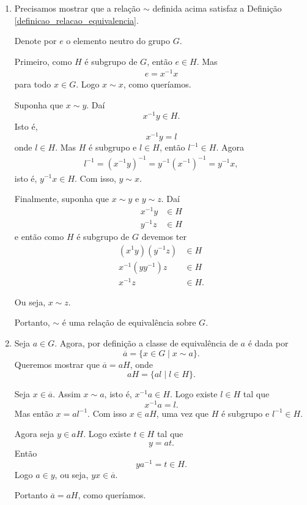 \begin{prova}
    \begin{enumerate}[label={\roman*})]
        \item Precisamos mostrar que a relação $\sim$ definida acima satisfaz a Definição \eqref{definicao_relacao_equivalencia}.

        Denote por $e$ o elemento neutro do grupo $G$.

        Primeiro, como $H$ é subgrupo de $G$, então $e \in H$. Mas
        \begin{align*}
            e = x^{-1}x
        \end{align*}
        para todo $x \in G$. Logo $x \sim x$, como queríamos.

        Suponha que $x \sim y$. Daí
        \[
            x^{-1}y \in H.
        \]
        Isto é,
        \[
            x^{-1}y = l
        \]
        onde $l \in H$. Mas $H$ é subgrupo e $l \in H$, então $l^{-1} \in H$. Agora
        \begin{align*}
            l^{-1} = (x^{-1}y)^{-1} = y^{-1}(x^{-1})^{-1} = y^{-1}x,
        \end{align*}
        isto é, $y^{-1}x \in H$. Com isso, $y \sim x$.

        Finalmente, suponha que $x \sim y$ e $y \sim z$. Daí
        \begin{align*}
            x^{-1}y &\in H\\
            y^{-1}z &\in H
        \end{align*}
        e então como $H$ é subgrupo de $G$ devemos ter
        \begin{align*}
            (x^{1}y)(y^{-1}z) &\in H\\
            x^{-1}(yy^{-1})z &\in H\\
            x^{-1}z &\in H.
        \end{align*}

        Ou seja, $x \sim z$.

        Portanto, $\sim$ é uma relação de equivalência sobre $G$.

        \item Seja $a \in G$. Agora, por definição a classe de equivalência de $a$ é dada por
        \[
            \overline{a} = \{ x \in G \mid x \sim a\}.
        \]
        Queremos mostrar que $\overline{a} = aH$, onde
        \[
            aH = \{al \mid l \in H\}.
        \]

        Seja $x \in \overline{a}$. Assim $x \sim a$, isto é, $x^{-1}a \in H$. Logo existe $l \in H$ tal que
        \[
            x^{-1}a = l.
        \]
        Mas então $x = al^{-1}$. Com isso $x \in aH$, uma vez que $H$ é subgrupo e $l^{-1} \in H$.

        Agora seja $y \in aH$. Logo existe $t \in H$ tal que
        \[
            y = at.
        \]
        Então
        \[
            ya^{-1} = t \in H.
        \]
        Logo $a \in y$, ou seja, $yx \in \overline{a}$.

        Portanto $\overline{a} = aH$, como queríamos.
    \end{enumerate}
\end{prova}

